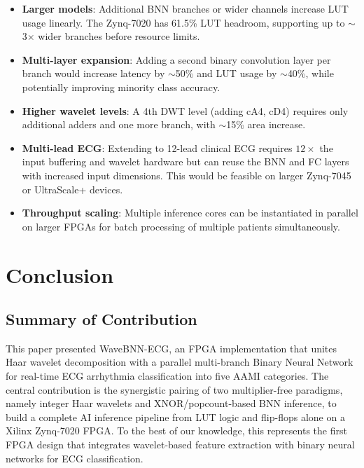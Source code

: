 \documentclass[conference]{IEEEtran}
\begin{document}
\begin{itemize}
    \item \textbf{Larger models}: Additional BNN branches or wider channels increase LUT usage linearly. The Zynq-7020 has 61.5\% LUT headroom, supporting up to $\sim$3$\times$ wider branches before resource limits.
    \item \textbf{Multi-layer expansion}: Adding a second binary convolution layer per branch would increase latency by $\sim$50\% and LUT usage by $\sim$40\%, while potentially improving minority class accuracy.
    \item \textbf{Higher wavelet levels}: A 4th DWT level (adding cA4, cD4) requires only additional adders and one more branch, with $\sim$15\% area increase.
    \item \textbf{Multi-lead ECG}: Extending to 12-lead clinical ECG requires $12\times$ the input buffering and wavelet hardware but can reuse the BNN and FC layers with increased input dimensions. This would be feasible on larger Zynq-7045 or UltraScale+ devices.
    \item \textbf{Throughput scaling}: Multiple inference cores can be instantiated in parallel on larger FPGAs for batch processing of multiple patients simultaneously.
\end{itemize}

\section{Conclusion}

\subsection{Summary of Contribution}

This paper presented WaveBNN-ECG, an FPGA implementation that unites Haar wavelet decomposition with a parallel multi-branch Binary Neural Network for real-time ECG arrhythmia classification into five AAMI categories. The central contribution is the synergistic pairing of two multiplier-free paradigms, namely integer Haar wavelets and XNOR/popcount-based BNN inference, to build a complete AI inference pipeline from LUT logic and flip-flops alone on a Xilinx Zynq-7020 FPGA. To the best of our knowledge, this represents the first FPGA design that integrates wavelet-based feature extraction with binary neural networks for ECG classification.
\end{document}
